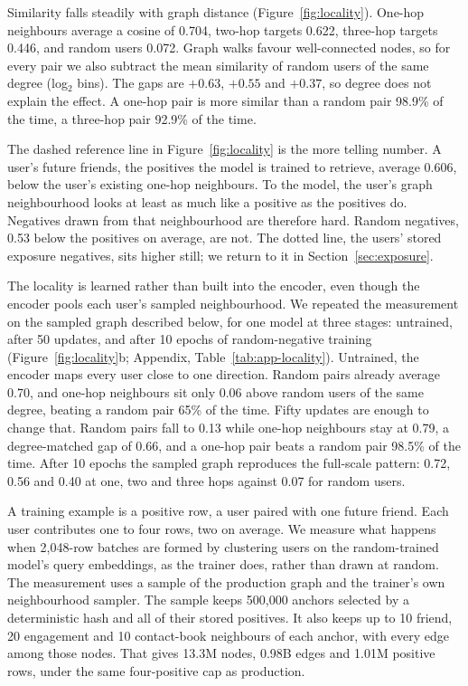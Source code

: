 Similarity falls steadily with graph distance (Figure~\ref{fig:locality}). One-hop neighbours average a cosine of
0.704, two-hop targets 0.622, three-hop targets 0.446, and random users 0.072. Graph walks favour well-connected nodes,
so for every pair we also subtract the mean similarity of random users of the same degree (log$_2$ bins). The gaps are
$+0.63$, $+0.55$ and $+0.37$, so degree does not explain the effect. A one-hop pair is more similar than a random pair
98.9\% of the time, a three-hop pair 92.9\% of the time.

The dashed reference line in Figure~\ref{fig:locality} is the more telling number. A user's future friends, the
positives the model is trained to retrieve, average 0.606, below the user's existing one-hop neighbours. To the model,
the user's graph neighbourhood looks at least as much like a positive as the positives do. Negatives drawn from that
neighbourhood are therefore hard. Random negatives, 0.53 below the positives on average, are not. The dotted line, the
users' stored exposure negatives, sits higher still; we return to it in Section~\ref{sec:exposure}.

The locality is learned rather than built into the encoder, even though the encoder pools each user's sampled
neighbourhood. We repeated the measurement on the sampled graph described below, for one model at three stages:
untrained, after 50 updates, and after 10 epochs of random-negative training (Figure~\ref{fig:locality}b;
Appendix, Table~\ref{tab:app-locality}).
Untrained, the encoder maps every user close to one direction. Random pairs already average 0.70, and one-hop
neighbours sit only 0.06 above random users of the same degree, beating a random pair 65\% of the time. Fifty updates
are enough to change that. Random pairs fall to 0.13 while one-hop neighbours stay at 0.79, a degree-matched gap of
0.66, and a one-hop pair beats a random pair 98.5\% of the time. After 10 epochs the sampled graph reproduces the
full-scale pattern: 0.72, 0.56 and 0.40 at one, two and three hops against 0.07 for random users.

 A training example is a positive row, a user paired
with one future friend. Each user contributes one to four rows, two on average. We measure what happens when 2{,}048-row
batches are formed by clustering users on the random-trained model's query embeddings, as the trainer does, rather than
drawn at random. The measurement uses a sample of the production graph and the trainer's own neighbourhood sampler.
The sample keeps 500{,}000 anchors selected by a deterministic hash and all of their stored positives. It also keeps up
to 10 friend, 20 engagement and 10 contact-book neighbours of each anchor, with every edge among those nodes. That
gives 13.3M nodes, 0.98B edges and 1.01M positive rows, under the same four-positive cap as production.
\label{sec:locality:batch}

